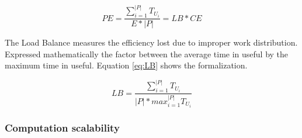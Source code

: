     \begin{equation}\label{eq:PE}
      PE=\frac{\sum_{i=1}^{|P|} T_{U_i}}{E\ast|P|}=LB\ast CE
    \end{equation}

    The Load Balance measures the efficiency lost due to improper work distribution. Expressed mathematically the factor between the average time in useful by the maximum time in useful. Equation \ref{eq:LB} shows the formalization.

    \begin{equation}\label{eq:LB}
      LB=\frac{\sum_{i=1}^{|P|}T_{U_{i}}}{|P|\ast max^{|P|}_{i=1}T_{U_i}}
    \end{equation}
\subsubsection{Computation scalability}


